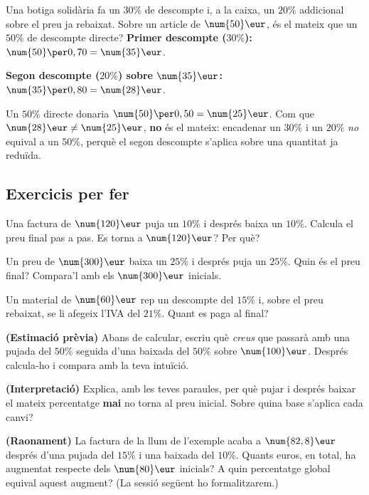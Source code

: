 \begin{exresolt}
Una botiga solidària fa un $30\%$ de descompte i, a la caixa, un $20\%$ addicional
sobre el preu ja rebaixat. Sobre un article de $\num{50}\eur$, és el mateix que un
$50\%$ de descompte directe?
\solucio
\textbf{Primer descompte ($30\%$):} $\num{50}\per 0,70=\num{35}\eur$.

\textbf{Segon descompte ($20\%$) sobre $\num{35}\eur$:} $\num{35}\per 0,80=\num{28}\eur$.

Un $50\%$ directe donaria $\num{50}\per 0,50=\num{25}\eur$. Com que $\num{28}\eur\neq
\num{25}\eur$, \textbf{no} és el mateix: encadenar un $30\%$ i un $20\%$ \emph{no}
equival a un $50\%$, perquè el segon descompte s'aplica sobre una quantitat ja
reduïda.
\end{exresolt}

\subsection{Exercicis per fer}

\begin{exercicis}
\begin{exlist}
  \item Una factura de $\num{120}\eur$ puja un $10\%$ i després baixa un $10\%$.
        Calcula el preu final pas a pas. Es torna a $\num{120}\eur$? Per què?
  \item Un preu de $\num{300}\eur$ baixa un $25\%$ i després puja un $25\%$. Quin és el
        preu final? Compara'l amb els $\num{300}\eur$ inicials.
  \item Un material de $\num{60}\eur$ rep un descompte del $15\%$ i, sobre el preu
        rebaixat, se li afegeix l'IVA del $21\%$. Quant es paga al final?
  \item \textbf{(Estimació prèvia)} Abans de calcular, escriu què \emph{creus} que
        passarà amb una pujada del $50\%$ seguida d'una baixada del $50\%$ sobre
        $\num{100}\eur$. Després calcula-ho i compara amb la teva intuïció.
  \item \textbf{(Interpretació)} Explica, amb les teves paraules, per què pujar i
        després baixar el mateix percentatge \textbf{mai} no torna al preu inicial.
        Sobre quina base s'aplica cada canvi?
  \item \textbf{(Raonament)} La factura de la llum de l'exemple acaba a $\num{82,8}\eur$
        després d'una pujada del $15\%$ i una baixada del $10\%$. Quants euros, en
        total, ha augmentat respecte dels $\num{80}\eur$ inicials? A quin percentatge
        global equival aquest augment? (La sessió següent ho formalitzarem.)
\end{exlist}
\end{exercicis}

